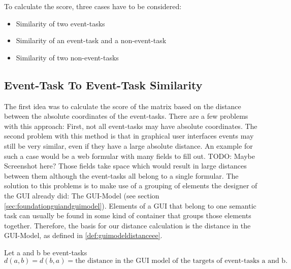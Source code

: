 To calculate the score, three cases have to be considered:
\begin{itemize}
	\item Similarity of two event-tasks
	\item Similarity of an event-task and a non-event-task
	\item Similarity of two non-event-tasks
\end{itemize}

\subsection{Event-Task To Event-Task Similarity}
The first idea was to calculate the score of the matrix based on the distance between the absolute coordinates of the event-tasks.
There are a few problems with this approach: First, not all event-tasks may have absolute coordinates.
The second problem with this method is that in graphical user interfaces events may still be very similar, even if they have a large absolute distance.
An example for such a case would be a web formular with many fields to fill out.
TODO: Maybe Screenshot here?
Those fields take space which would result in large distances between them although the event-tasks all belong to a single formular.
The solution to this problems is to make use of a grouping of elements the designer of the GUI already did: The GUI-Model (see section \ref{sec:foundationguiandguimodel}).
Elements of a GUI that belong to one semantic task can usually be found in some kind of container that groups those elements together.
Therefore, the basis for our distance calculation is the distance in the GUI-Model, as defined in \ref{def:guimodeldistanceee}.

\begin{definition}
	\item Let a and b be event-tasks
\begin{equation*}d(a,b) = d(b,a) = \text{the distance in the GUI model of the targets of event-tasks a and b.}
\end{equation*}
\label{def:guimodeldistanceee}
\end{definition}

